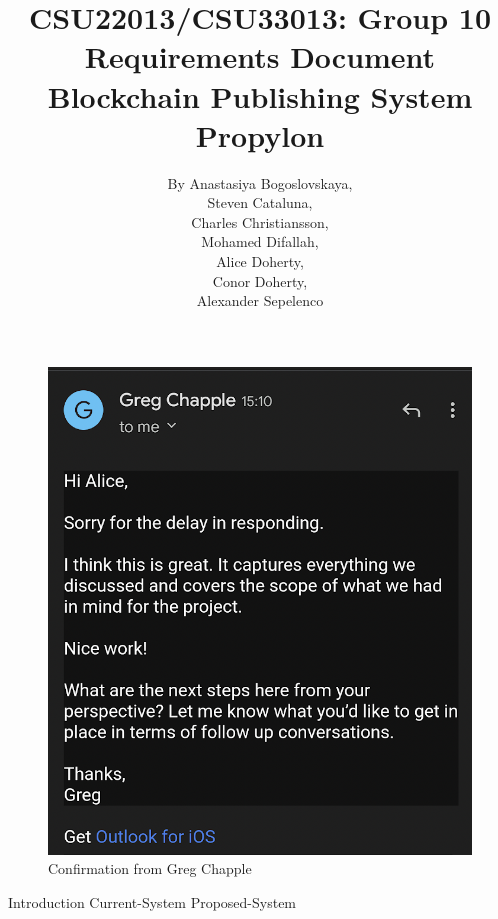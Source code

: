 \documentclass{article}
\title{
	{CSU22013/CSU33013: Group 10}\\
	{Requirements Document}\\
	{Blockchain Publishing System}\\
	{\large Propylon}
}
\author{
	{By Anastasiya Bogoslovskaya,}\\
	{Steven Cataluna,} \\
	{Charles Christiansson,} \\
    {Mohamed Difallah,} \\
	{Alice Doherty,} \\
	{Conor Doherty,} \\
	{Alexander Sepelenco}
}
\date{} %
\begin{document}
\begin{figure}[h]
\centering %
\includegraphics[scale=0.5]{gc-confirmation} %
\caption{Confirmation from Greg Chapple}
\label{fig: gc-confirmation} %
\end{figure}

\maketitle %
\tableofcontents %

{Introduction} 
{Current-System}
{Proposed-System}
\end{document}
